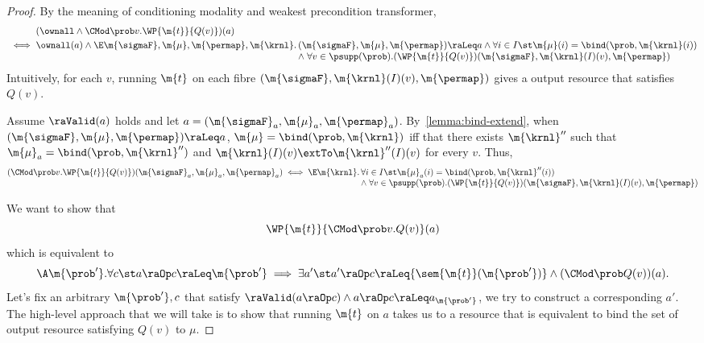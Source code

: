 \begin{proof}
    By the meaning of conditioning modality and weakest precondition transformer,
    \begin{align*}
    &(\ownall \land \CMod\prob v. \WP {\m{t}} {Q(v)})(a) \\
    {}\iff{}
    &\ownall(a) \land
    \begin{array}[t]{@{}r@{\,}l@{}}
    \E \m{\sigmaF}, \m{\mu}, \m{\permap}, \m{\krnl}.
      & (\m{\sigmaF}, \m{\mu}, \m{\permap}) \raLeq a
      \land
        \forall i\in I\st
        \m{\mu}(i) = \bind(\prob, \m{\krnl}(i))
      \\ & \land \;
        \forall v \in \psupp(\prob).
          (\WP {\m{t}} {Q(v)})(\m{\sigmaF}, \m{\krnl}(I)(v), \m{\permap})
    \end{array}
  \end{align*}
Intuitively, for each $v$,
  running $\m{t}$ on each fibre $(\m{\sigmaF}, \m{\krnl}(I)(v), \m{\permap})$
  gives a output resource that satisfies $Q(v)$.

  Assume $\raValid(a)$ holds and let
  $a = (\m{\sigmaF}_a, \m{\mu}_a, \m{\permap}_a)$.
  By~\cref{lemma:bind-extend},
  when $ (\m{\sigmaF}, \m{\mu}, \m{\permap}) \raLeq a$,
  $\m{\mu} = \bind(\prob, \m{\krnl})$ iff that there exists $\m{\krnl}''$ such that
  $\m{\mu}_a = \bind(\prob, \m{\krnl}'')$  and $\m{\krnl}(I)(v) \extTo \m{\krnl}''(I)(v)$ for every $v$.
  Thus,
\begin{align*}
    (\CMod\prob v. \WP {\m{t}} {Q(v)})(\m{\sigmaF}_a, \m{\mu}_a, \m{\permap}_a)
    \iff
    \begin{array}[t]{@{}r@{\,}l@{}}
    \E \m{\krnl}.
      &\forall i\in I\st
        \m{\mu}_a (i) = \bind(\prob, \m{\krnl}''(i))
        \\ & \land \;
        \forall v \in \psupp(\prob).
          (\WP {\m{t}} {Q(v)})(\m{\sigmaF}, \m{\krnl}(I)(v), \m{\permap})
    \end{array}
  \end{align*}

  We want to show that
  \[
      \WP {\m{t}}{\CMod\prob v. {Q(v)}} (a)
    \]
  which is equivalent to
  \[
        \A \m{\prob'}.
        \forall c\st
        a\raOp c \raLeq \m{\prob'}
          \implies
            \exists a'\st
            a'\raOp c \raLeq {\sem{\m{t}} (\m{\prob'})}
            \land
            (\CMod \prob Q(v))(a).
  \]
  Let's fix an arbitrary $ \m{\prob'}, c $ that satisfy
  $\raValid(a \raOp c) \land  a\raOp c \raLeq a_{\m{\prob'}}$,
  we try to construct a corresponding $a'$.
  The high-level approach that we will take is to show that running $\m{t}$ on $a$ takes us to a resource that is equivalent to bind the set of output resource satisfying $Q(v)$ to $\mu$.




\end{proof}
